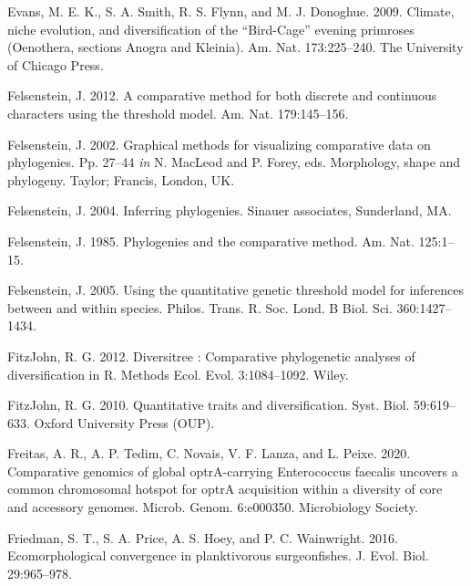 \documentclass[fleqn,10pt,lineno]{wlpeerj} %
\newlength{\cslhangindent}
\newlength{\cslentryspacingunit} %
\newenvironment{CSLReferences}[2] %
 {%
  \setlength{\parindent}{0pt}
  \ifodd #1
  \let\oldpar\par
  \def\par{\hangindent=\cslhangindent\oldpar}
  \fi
  \setlength{\parskip}{#2\cslentryspacingunit}
 }%
 {}
\begin{document}
\begin{CSLReferences}{1}{0}
\leavevmode{}%
Evans, M. E. K., S. A. Smith, R. S. Flynn, and M. J. Donoghue. 2009. Climate, niche evolution, and diversification of the {{``Bird-Cage''}} evening primroses ({O}enothera, sections {A}nogra and {K}leinia). Am. Nat. 173:225--240. The University of Chicago Press.

\leavevmode{}%
Felsenstein, J. 2012. A comparative method for both discrete and continuous characters using the threshold model. Am. Nat. 179:145--156.

\leavevmode{}%
Felsenstein, J. 2002. Graphical methods for visualizing comparative data on phylogenies. Pp. 27--44 \emph{in} N. MacLeod and P. Forey, eds. Morphology, shape and phylogeny. Taylor; Francis, London, UK.

\leavevmode{}%
Felsenstein, J. 2004. Inferring phylogenies. Sinauer associates, Sunderland, MA.

\leavevmode{}%
Felsenstein, J. 1985. Phylogenies and the comparative method. Am. Nat. 125:1--15.

\leavevmode{}%
Felsenstein, J. 2005. Using the quantitative genetic threshold model for inferences between and within species. Philos. Trans. R. Soc. Lond. B Biol. Sci. 360:1427--1434.

\leavevmode{}%
FitzJohn, R. G. 2012. Diversitree : Comparative phylogenetic analyses of diversification in {R}. Methods Ecol. Evol. 3:1084--1092. Wiley.

\leavevmode{}%
FitzJohn, R. G. 2010. Quantitative traits and diversification. Syst. Biol. 59:619--633. Oxford University Press (OUP).

\leavevmode{}%
Freitas, A. R., A. P. Tedim, C. Novais, V. F. Lanza, and L. Peixe. 2020. Comparative genomics of global optr{A}-carrying {Enterococcus faecalis} uncovers a common chromosomal hotspot for optr{A} acquisition within a diversity of core and accessory genomes. Microb. Genom. 6:e000350. Microbiology Society.

\leavevmode{}%
Friedman, S. T., S. A. Price, A. S. Hoey, and P. C. Wainwright. 2016. Ecomorphological convergence in planktivorous surgeonfishes. J. Evol. Biol. 29:965--978.


\end{CSLReferences}
\end{document}
